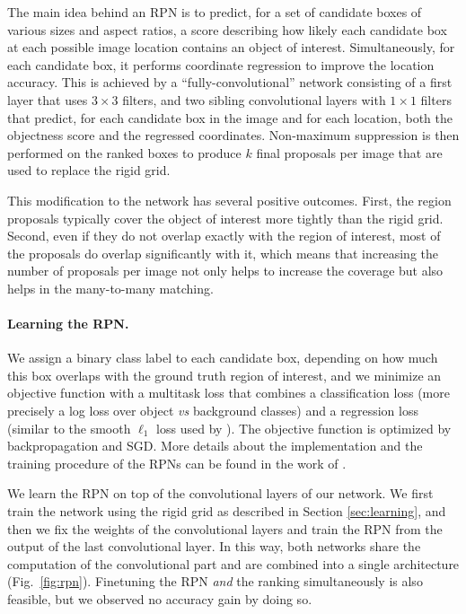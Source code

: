 \documentclass[twocolumn]{svjour3}          \smartqed  \usepackage{graphicx}
\begin{document}
The main idea behind an RPN is to predict, for a set of candidate boxes of various sizes and aspect ratios, a score describing how likely each candidate box at each possible image location contains an object of interest.
 Simultaneously, for each candidate box, it performs coordinate regression to improve the location accuracy.
This is achieved by a ``fully-convolutional'' network consisting of a first layer that uses $3\times 3$ filters, and two sibling convolutional layers with $1\times 1$ filters that predict, for each candidate box in the image and for each location, both the objectness score and the regressed coordinates. Non-maximum suppression is then performed on the ranked boxes to produce $k$ final proposals per image that are used to replace the rigid grid.

This modification to the network has several positive outcomes. First, the region proposals typically cover the object of interest more tightly than the rigid grid. Second, even if they do not overlap exactly with the region of interest, most of the proposals do overlap significantly with it, which means that increasing the number of proposals per image not only helps to increase the coverage but also helps in the many-to-many matching.

\paragraph{Learning the RPN.} We assign a binary class label to each candidate box, depending on how much
this box overlaps with the ground truth region of interest, and we minimize an objective function with a multitask loss that combines a
classification loss (more precisely a log loss over object \emph{vs} background classes)
and a regression loss (similar to the smooth $\ell_1$ loss used by \cite{Girshick2015}). The objective function is optimized by backpropagation and SGD.
More details about the implementation and the training procedure of the RPNs can be found in the work of \cite{Ren2015faster}.

We learn the RPN on top of the convolutional layers of our network. We first train the network using the rigid grid as described in Section \ref{sec:learning}, and then we fix the weights of the convolutional layers and train the RPN from the output of the last convolutional layer. In this way, both networks share the computation of the convolutional part and are combined into a single architecture (Fig.~\ref{fig:rpn}). Finetuning the RPN \emph{and} the ranking simultaneously is also feasible, but we observed no accuracy gain by doing so. 
\end{document}
